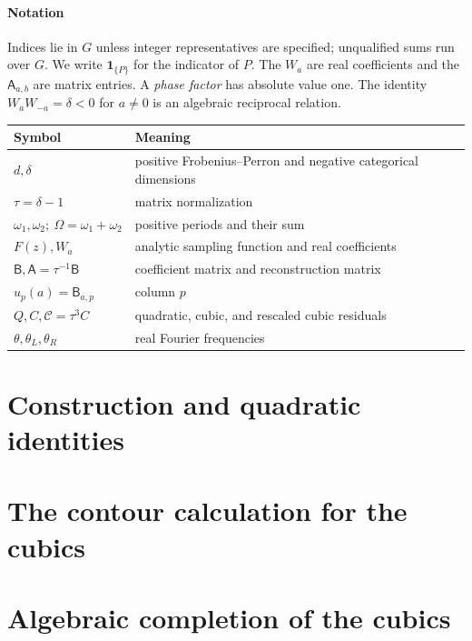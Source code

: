 \documentclass[11pt]{article}
\numberwithin{equation}{section}
\theoremstyle{definition}
\theoremstyle{remark}
\newcommand{\ind}[1]{\mathbf1_{\{#1\}}}
\begin{document}
\subsection*{Notation}
Indices lie in $G$ unless integer representatives are specified;
unqualified sums run over $G$. We write $\ind{P}$ for the indicator
of $P$. The $W_a$ are real coefficients and the $\mathsf A_{a,b}$
are matrix entries. A \emph{phase factor} has absolute value one.
The identity $W_aW_{-a}=\delta<0$ for $a\ne0$ is an algebraic
reciprocal relation.
\begin{center}
\small
\begin{tabular}{ll}
\toprule
Symbol & Meaning \\
\midrule
$d,\delta$ & positive Frobenius--Perron and negative categorical dimensions \\
$\tau=\delta-1$ & matrix normalization \\
$\omega_1,\omega_2;\ \Omega=\omega_1+\omega_2$ & positive periods and their sum \\
$F(z),W_a$ & analytic sampling function and real coefficients \\
$\mathsf B,\mathsf A=\tau^{-1}\mathsf B$ & coefficient matrix and reconstruction matrix \\
$u_p(a)=\mathsf B_{a,p}$ & column $p$ \\
$Q,C,\mathcal C=\tau^3 C$ & quadratic, cubic, and rescaled cubic residuals \\
$\theta,\theta_L,\theta_R$ & real Fourier frequencies \\
\bottomrule
\end{tabular}
\end{center}
\clearpage

\part{Construction and quadratic identities}
\label{part:quadratics}



\part{The contour calculation for the cubics}
\label{part:contours}


\part{Algebraic completion of the cubics}
\label{part:completion}

\end{document}
